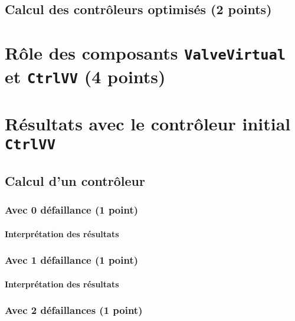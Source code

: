 \documentclass[a4paper]{book}
\begin{document}
\subsection{Calcul des contrôleurs optimisés (2 points)}

\section{Rôle des composants {\tt ValveVirtual} et {\tt CtrlVV} (4 points)}

\section{Résultats avec le contrôleur initial {\tt CtrlVV}}

\subsection{Calcul d'un contrôleur}

\subsubsection{Avec 0 défaillance (1 point)}





\paragraph{Interprétation des résultats}

\subsubsection{Avec 1 défaillance (1 point)}





\paragraph{Interprétation des résultats}

\subsubsection{Avec 2 défaillances (1 point)}





\end{document}
